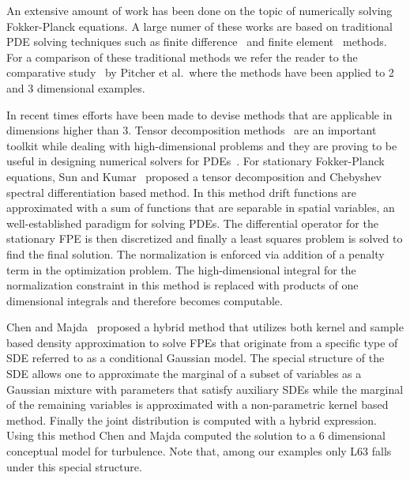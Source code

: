 An extensive amount of work has been done on the topic of numerically solving Fokker-Planck equations. A large numer of these works are based on traditional PDE solving techniques such as finite difference~\cite{berezin1987conservative, whitney1970finite, sepehrian2015numerical} and finite element~\cite{naprstek2014finite, masud2005application} methods. For a comparison of these traditional methods we refer the reader to the comparative study~\cite{pichler2013numerical} by Pitcher et al.~where the methods have been applied to 2 and 3 dimensional examples. 


In recent times efforts have been made to devise methods that are applicable in dimensions higher than 3. Tensor decomposition methods~\cite{Hackbusch2005HierarchicalKT, kolda2009tensor} are an important toolkit while dealing with high-dimensional problems and they are proving to be useful in designing numerical solvers for PDEs~\cite{ballani2013projection, kressner2010krylov}.  For stationary Fokker-Planck equations, Sun and Kumar~\cite{sun2014numerical} proposed a tensor decomposition and Chebyshev spectral differentiation based method. In this method drift functions are approximated with a sum of functions that are separable in spatial variables, an well-established paradigm for solving PDEs. The differential operator for the stationary FPE is then discretized and finally a least squares problem is solved to find the final solution. The normalization is enforced via addition of a penalty term in the optimization problem. The high-dimensional integral for the normalization constraint in this method is replaced with  products of one dimensional integrals and therefore becomes computable.   

Chen and Majda~\cite{chen2018efficient} proposed a hybrid method that utilizes both kernel and sample based density approximation to solve FPEs that originate from a specific type of SDE referred to as a conditional Gaussian model.
The special structure of the SDE allows one to approximate %
the marginal of a subset of variables as a Gaussian mixture with parameters that satisfy auxiliary SDEs while the marginal of the remaining variables 
is approximated with a non-parametric kernel based method. Finally the joint distribution 
is computed with a hybrid expression. Using this method Chen and Majda computed the solution to a 6 dimensional conceptual model for turbulence. Note that, among our examples only L63 falls under this special  structure.

